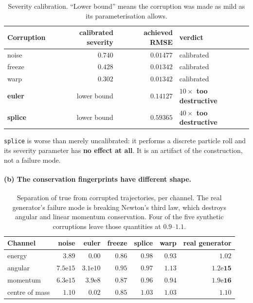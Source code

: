 \documentclass[11pt]{article}
\begin{document}
\begin{table}[t]
\centering
\small
\caption{Severity calibration. ``Lower bound'' means the corruption was made as mild as
its parameterisation allows.}
\label{tab:calib}
\begin{tabular}{lrrl}
\toprule
Corruption & calibrated severity & achieved RMSE & verdict \\
\midrule
noise & $0.740$ & $0.01477$ & calibrated \\
freeze & $0.428$ & $0.01342$ & calibrated \\
warp & $0.302$ & $0.01342$ & calibrated \\
\textbf{euler} & lower bound & $\mathbf{0.14127}$ & \textbf{$10\times$ too destructive} \\
\textbf{splice} & lower bound & $\mathbf{0.59365}$ & \textbf{$40\times$ too destructive} \\
\bottomrule
\end{tabular}
\end{table}

\texttt{splice} is worse than merely uncalibrated: it performs a discrete particle roll
and its severity parameter has \textbf{no effect at all}. It is an artifact of the
construction, not a failure mode.

\paragraph{(b) The conservation fingerprints have different shape.}

\begin{table}[t]
\centering
\small
\caption{Separation of true from corrupted trajectories, per channel. The real
generator's failure mode is breaking Newton's third law, which destroys angular and
linear momentum conservation. Four of the five synthetic corruptions leave those
quantities at $0.9$--$1.1$.}
\label{tab:fingerprint}
\begin{tabular}{lrrrrrr}
\toprule
Channel & noise & euler & freeze & splice & warp & \textbf{real generator} \\
\midrule
energy & $3.89$ & $0.00$ & $0.86$ & $0.98$ & $0.93$ & $\mathbf{1.02}$ \\
angular & $7.5\mathrm{e}{15}$ & $3.1\mathrm{e}{10}$ & $0.95$ & $0.97$ & $1.13$ & $\mathbf{1.2\mathrm{e}{15}}$ \\
momentum & $6.3\mathrm{e}{15}$ & $3.9\mathrm{e}{8}$ & $0.87$ & $0.96$ & $0.94$ & $\mathbf{1.9\mathrm{e}{16}}$ \\
centre of mass & $1.10$ & $0.02$ & $0.85$ & $1.03$ & $1.03$ & $\mathbf{1.10}$ \\
\bottomrule
\end{tabular}
\end{table}
\end{document}
